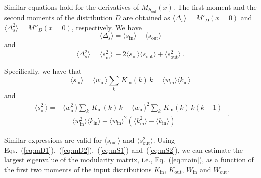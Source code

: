 \documentclass[a4paper,pre,superscriptaddress,floatfix,nofootinbib,twocolumn]{revtex4-1}
\begin{document}
Similar equations hold for the derivatives of $M_{S_\text{out}}(x)$.
The first moment  and the second moments  of the distribution $D$ are
obtained as $\langle \Delta_s \rangle = M'_D(x=0)$ and $\langle \Delta_s^2 \rangle = M''_D(x=0)$, respectively. We have
\begin{equation}
\langle \Delta_s \rangle   = \langle s_\text{in} \rangle   - \langle s_\text{out} \rangle
\label{eq:mD1}
\end{equation}
and
\begin{equation}
\langle \Delta_s^2 \rangle  = \langle s^2_\text{in} \rangle \,
- 2 \langle s_\text{in} \rangle \langle s_\text{out} \rangle + \langle s^2_\text{out} \rangle \; .
\label{eq:mD2}
\end{equation}

Specifically, we have that
\begin{equation}
\langle s_\text{in} \rangle =
\langle w_\text{in} \rangle \sum_{k} \, K_\text{in}(k) \, k = \langle w_\text{in} \rangle \langle k_\text{in} \rangle
\label{eq:mS1}
\end{equation}
and
\begin{equation}
\begin{array}{ll}
\langle s^2_\text{in} \rangle = & \langle w^2_\text{in} \rangle \sum_{k} \, K_\text{in}(k) \, k  + \langle w_\text{in} \rangle^2 \sum_{k} \, K_\text{in}(k) \, k (k-1)
\\
& =\langle w^2_\text{in} \rangle \langle k_\text{in} \rangle + \langle w_\text{in} \rangle^2 \left( \langle k^2_\text{in} \rangle - \langle k_\text{in} \rangle  \right)
\end{array}
\; .
\label{eq:mS2}
\end{equation}

Similar expressions are valid for $\langle s_\text{out} \rangle$ and $\langle s^2_\text{out} \rangle$.
Using Eqs.~(\ref{eq:mD1}),~(\ref{eq:mD2}),~(\ref{eq:mS1}) and~(\ref{eq:mS2}), we can estimate the largest eigenvalue of the modularity matrix, i.e., Eq.~(\ref{eq:main}), as a function of the first two moments of the input distributions $K_\text{in}$, $K_\text{out}$, $W_\text{in}$ and $W_\text{out}$.
\end{document}

